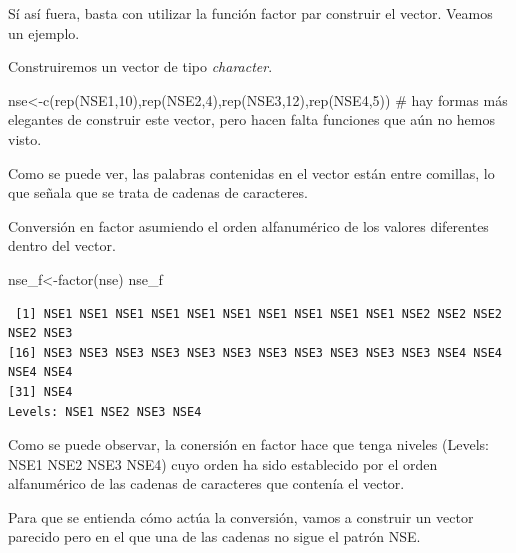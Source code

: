 \documentclass[
  letterpaper,
  DIV=11,
  numbers=noendperiod]{scrreprt}
\newenvironment{Shaded}{\begin{snugshade}}{\end{snugshade}}
\newcommand{\CommentTok}[1]{\textcolor[rgb]{0.37,0.37,0.37}{#1}}
\newcommand{\DecValTok}[1]{\textcolor[rgb]{0.68,0.00,0.00}{#1}}
\newcommand{\FunctionTok}[1]{\textcolor[rgb]{0.28,0.35,0.67}{#1}}
\newcommand{\NormalTok}[1]{\textcolor[rgb]{0.00,0.23,0.31}{#1}}
\newcommand{\OtherTok}[1]{\textcolor[rgb]{0.00,0.23,0.31}{#1}}
\newcommand{\StringTok}[1]{\textcolor[rgb]{0.13,0.47,0.30}{#1}}
\begin{document}
Sí así fuera, basta con utilizar la función factor par construir el
vector. Veamos un ejemplo.

Construiremos un vector de tipo \emph{character}.

\begin{Shaded}
\begin{Highlighting}[]
\NormalTok{nse}\OtherTok{\textless{}{-}}\FunctionTok{c}\NormalTok{(}\FunctionTok{rep}\NormalTok{(}\StringTok{\textquotesingle{}NSE1\textquotesingle{}}\NormalTok{,}\DecValTok{10}\NormalTok{),}\FunctionTok{rep}\NormalTok{(}\StringTok{\textquotesingle{}NSE2\textquotesingle{}}\NormalTok{,}\DecValTok{4}\NormalTok{),}\FunctionTok{rep}\NormalTok{(}\StringTok{\textquotesingle{}NSE3\textquotesingle{}}\NormalTok{,}\DecValTok{12}\NormalTok{),}\FunctionTok{rep}\NormalTok{(}\StringTok{\textquotesingle{}NSE4\textquotesingle{}}\NormalTok{,}\DecValTok{5}\NormalTok{))}
\CommentTok{\# hay formas más elegantes de construir este vector, pero hacen falta funciones que aún no hemos visto.}
\end{Highlighting}
\end{Shaded}

Como se puede ver, las palabras contenidas en el vector están entre
comillas, lo que señala que se trata de cadenas de caracteres.

Conversión en factor asumiendo el orden alfanumérico de los valores
diferentes dentro del vector.

\begin{Shaded}
\begin{Highlighting}[]
\NormalTok{nse\_f}\OtherTok{\textless{}{-}}\FunctionTok{factor}\NormalTok{(nse)}
\NormalTok{nse\_f}
\end{Highlighting}
\end{Shaded}

\begin{verbatim}
 [1] NSE1 NSE1 NSE1 NSE1 NSE1 NSE1 NSE1 NSE1 NSE1 NSE1 NSE2 NSE2 NSE2 NSE2 NSE3
[16] NSE3 NSE3 NSE3 NSE3 NSE3 NSE3 NSE3 NSE3 NSE3 NSE3 NSE3 NSE4 NSE4 NSE4 NSE4
[31] NSE4
Levels: NSE1 NSE2 NSE3 NSE4
\end{verbatim}

Como se puede observar, la conersión en factor hace que tenga niveles
(Levels: NSE1 NSE2 NSE3 NSE4) cuyo orden ha sido establecido por el
orden alfanumérico de las cadenas de caracteres que contenía el vector.

Para que se entienda cómo actúa la conversión, vamos a construir un
vector parecido pero en el que una de las cadenas no sigue el patrón
NSE.
\end{document}
